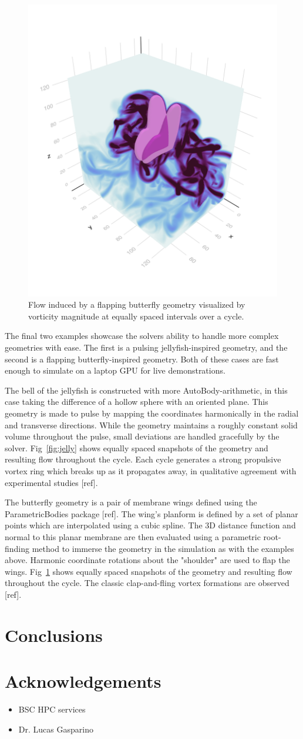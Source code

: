 \documentclass[final,3p,times]{elsarticle}
\begin{document}
\begin{figure}
    \includegraphics[width=0.32\linewidth,trim={90 150 70 200},clip]{img/Butterfly_6.png}
    
    \caption{Flow induced by a flapping butterfly geometry visualized by vorticity magnitude at equally spaced intervals over a cycle.}
    \label{fig:butterfly}
\end{figure}
The final two examples showcase the solvers ability to handle more complex geometries with ease. The first is a pulsing jellyfish-inspired geometry, and the second is a flapping butterfly-inspired geometry. Both of these cases are fast enough to simulate on a laptop GPU for live demonstrations.

The bell of the jellyfish is constructed with more AutoBody-arithmetic, in this case taking the difference of a hollow sphere with an oriented plane. This geometry is made to pulse by mapping the coordinates harmonically in the radial and transverse directions. While the geometry maintains a roughly constant solid volume throughout the pulse, small deviations are handled gracefully by the solver. Fig~\ref{fig:jelly} shows equally spaced snapshots of the geometry and resulting flow throughout the cycle. Each cycle generates a strong propulsive vortex ring which breaks up as it propagates away, in qualitative agreement with experimental studies [ref].

The butterfly geometry is a pair of membrane wings defined using the ParametricBodies package [ref]. The wing's planform is defined by a set of planar points which are interpolated using a cubic spline. The 3D distance function and normal to this planar membrane are then evaluated using a parametric root-finding method to immerse the geometry in the simulation as with the examples above. Harmonic coordinate rotations about the "shoulder" are used to flap the wings. Fig~\ref{fig:butterfly} shows equally spaced snapshots of the geometry and resulting flow throughout the cycle. The classic clap-and-fling vortex formations are observed [ref].

\section{Conclusions}\label{sec:conclusions}

\section{Acknowledgements}\label{sec:acknowledgements}
\begin{itemize}
    \item BSC HPC services
    \item Dr. Lucas Gasparino
\end{itemize}



\end{document}
